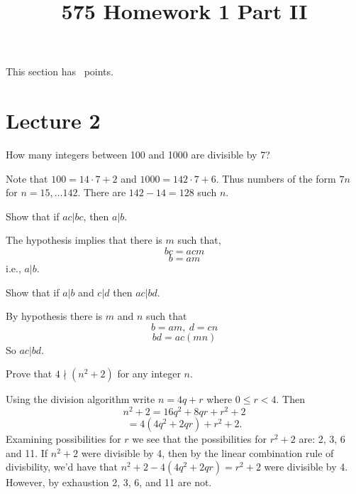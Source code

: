 



\printanswers

\title{575 Homework 1 Part II}
\maketitle

This section has \numpoints\ points.

\section{Lecture 2}

\begin{questions}

    \question[4] How many integers between 100 and 1000 are divisible by
    7?
    \begin{solution}
        Note that $100 = 14\cdot 7 + 2$ and $1000 = 142\cdot 7 +
        6$. Thus numbers of the form $7n$ for $n = 15, \ldots
        142$. There are $142 - 14 = 128$ such $n$.
    \end{solution}

    \question[3] Show that if $ac | bc$, then $a | b$.
    \begin{solution}
        The hypothesis implies that there is $m$ such that,
        $$bc = acm$$
        $$b = am$$
        i.e., $a | b$.
    \end{solution}

    \question[3] Show that if $a | b$ and $c | d$ then $ac | bd$.
    \begin{solution}
        By hypothesis there is $m$ and $n$ such that
        $$b = am,\ d = cn$$
        $$bd = ac(mn)$$
        So $ac | bd.$
    \end{solution}

    \question[8] Prove that $4 \nmid (n^2 + 2)$ for any integer $n$.
    \begin{solution}
        Using the division algorithm write $n = 4q + r$ where $0 \le r
        < 4.$ Then 
        $$n^2 + 2 = 16q^2 + 8qr + r^2 + 2$$
        $$ = 4(4q^2 + 2qr) + r^2 + 2.$$
        Examining possibilities for $r$ we see that the possibilities
        for $r^2 + 2$ are: 2, 3, 6 and 11. If $n^2 + 2$ were divisible
        by 4, then by the linear combination rule of divisbility, we'd
        have that $n^2 +2 - 4(4q^2 + 2qr) = r^2 + 2$ were divisible by
        4. However, by exhaustion 2, 3, 6, and 11 are not. 
    \end{solution}


\end{questions}
